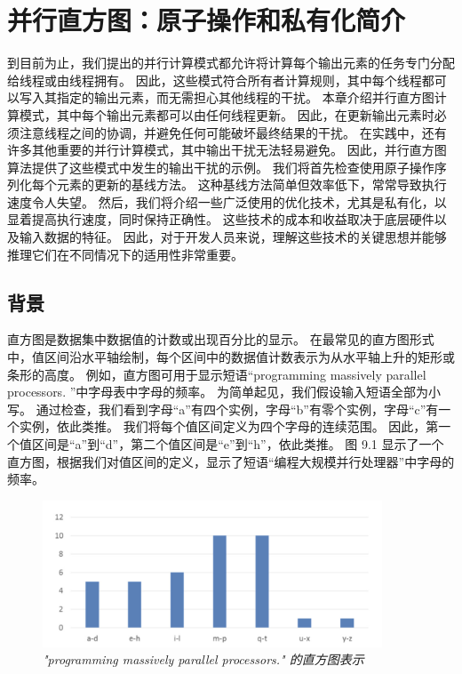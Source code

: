 \section{并行直方图：原子操作和私有化简介}
到目前为止，我们提出的并行计算模式都允许将计算每个输出元素的任务专门分配给线程或由线程拥有。 
因此，这些模式符合所有者计算规则，其中每个线程都可以写入其指定的输出元素，而无需担心其他线程的干扰。 
本章介绍并行直方图计算模式，其中每个输出元素都可以由任何线程更新。 
因此，在更新输出元素时必须注意线程之间的协调，并避免任何可能破坏最终结果的干扰。 
在实践中，还有许多其他重要的并行计算模式，其中输出干扰无法轻易避免。 
因此，并行直方图算法提供了这些模式中发生的输出干扰的示例。 我们将首先检查使用原子操作序列化每个元素的更新的基线方法。 
这种基线方法简单但效率低下，常常导致执行速度令人失望。 
然后，我们将介绍一些广泛使用的优化技术，尤其是私有化，以显着提高执行速度，同时保持正确性。 
这些技术的成本和收益取决于底层硬件以及输入数据的特征。 
因此，对于开发人员来说，理解这些技术的关键思想并能够推理它们在不同情况下的适用性非常重要。

\subsection{背景}
直方图是数据集中数据值的计数或出现百分比的显示。 
在最常见的直方图形式中，值区间沿水平轴绘制，每个区间中的数据值计数表示为从水平轴上升的矩形或条形的高度。 
例如，直方图可用于显示短语“programming massively parallel processors. ”中字母表中字母的频率。 
为简单起见，我们假设输入短语全部为小写。 
通过检查，我们看到字母“a”有四个实例，字母“b”有零个实例，字母“c”有一个实例，依此类推。 
我们将每个值区间定义为四个字母的连续范围。 因此，第一个值区间是“a”到“d”，第二个值区间是“e”到“h”，依此类推。 
图 9.1 显示了一个直方图，根据我们对值区间的定义，显示了短语“编程大规模并行处理器”中字母的频率。

\begin{figure}[H]
	\centering
	\includegraphics[width=0.9\textwidth]{figs/F9.1.png}
	\caption{\textit{"programming massively parallel processors." 的直方图表示}}
\end{figure}

